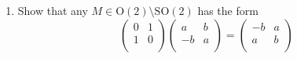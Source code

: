 \documentclass[../psets.tex]{subfiles}
\begin{document}
\begin{enumerate}
\begin{enumerate}
\begin{proof}
\begin{align*}
                &=
                \begin{pmatrix}
                    r\cos(\theta)\cos(\phi)+r\sin(\theta)\sin(\phi)\\
                    -r\sin(\theta)\cos(\phi)+r\cos(\theta)\sin(\phi)\\
                \end{pmatrix}\\
                &=
                \begin{pmatrix}
                    r\left[ \cos(\theta)\cos(\phi)+\sin(\theta)\sin(\phi) \right]\\
                    r\left[ \sin(\phi)\cos(\theta)-\cos(\phi)\sin(\theta) \right]\\
                \end{pmatrix}\\
                &=
                \begin{pmatrix}
                    r\left[ \cos(\theta-\phi) \right]\\
                    r\left[ \sin(\phi-\theta) \right]\\
                \end{pmatrix}\\
                &=
                \begin{pmatrix}
                    r\cos(\phi-\theta)\\
                    r\sin(\phi-\theta)\\
                \end{pmatrix}
            \end{align*}
        \end{proof}
        \item Show that any $M\in\text{O}(2)\setminus\text{SO}(2)$ has the form
        \begin{equation*}
            \begin{pmatrix}
                0 & 1\\
                1 & 0\\
            \end{pmatrix}
            \begin{pmatrix}
                a & b\\
                -b & a\\
            \end{pmatrix}
            =
            \begin{pmatrix}
                -b & a\\
                a & b\\

\end{pmatrix}
\end{equation*}
\end{enumerate}
\end{enumerate}
\end{document}
